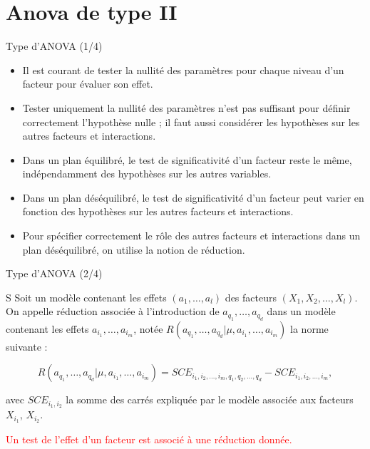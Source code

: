 \documentclass{beamer}
\begin{document}
	\section{Anova de type II}
	\begin{frame}{Type d'ANOVA (1/4)}
		\begin{itemize}
			\item Il est courant de tester la nullité des paramètres pour chaque niveau d'un facteur pour évaluer son effet.
			\item Tester uniquement la nullité des paramètres n'est pas suffisant pour définir correctement l'hypothèse nulle ; il faut aussi considérer les hypothèses sur les autres facteurs et interactions.
			\item Dans un plan équilibré, le test de significativité d'un facteur reste le même, indépendamment des hypothèses sur les autres variables.
			\item Dans un plan déséquilibré, le test de significativité d'un facteur peut varier en fonction des hypothèses sur les autres facteurs et interactions.
			\item Pour spécifier correctement le rôle des autres facteurs et interactions dans un plan déséquilibré, on utilise la notion de réduction.
		\end{itemize}
	\end{frame}
	
	\begin{frame}{Type d'ANOVA (2/4)}
		
		\begin{myblock}
			  S Soit un modèle contenant les effets $(a_1,\ldots,a_l)$ des facteurs $(X_1, X_2, \ldots, X_l)$. On appelle réduction associée à l'introduction de $a_{q_1}, \ldots, a_{q_d}$ dans un modèle contenant les effets $a_{i_1}, \ldots, a_{i_m}$, notée $R(a_{q_1}, \ldots, a_{q_d}|\mu,a_{i_1}, \ldots, a_{i_m})$ la norme suivante :
			
			\begin{equation}
				R(a_{q_1}, \ldots, a_{q_d}|\mu,a_{i_1}, \ldots, a_{i_m}) = SCE_{i_1,i_2,\ldots,i_m,q_1,q_2,\ldots,q_d} - SCE_{i_1,i_2,\ldots,i_m},
			\end{equation}
			
			avec $SCE_{i_1,i_2}$ la somme des carrés expliquée par le modèle associée aux facteurs $X_{i_1}$, $X_{i_2}$.
		\end{myblock}
		\textcolor{red}{Un test de l'effet d'un facteur est associé à une réduction donnée.}
	\end{frame}
	
\end{document}

